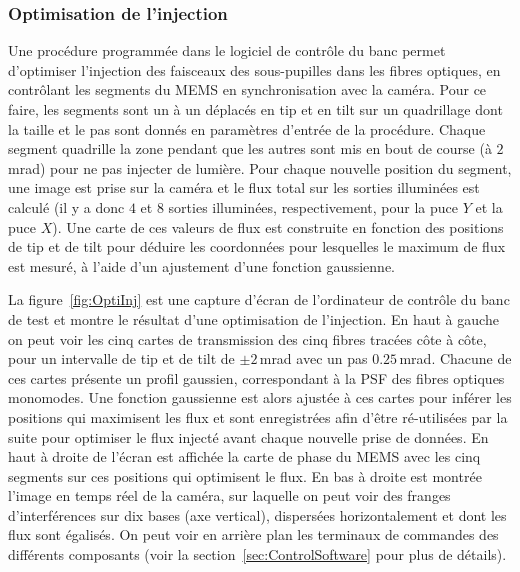 \subsubsection{Optimisation de l'injection}
\label{sec:OptiInj}

Une procédure programmée dans le logiciel de contrôle du banc permet d'optimiser l'injection des faisceaux des sous-pupilles dans les fibres optiques, en contrôlant les segments du \ac{MEMS} en synchronisation avec la caméra. Pour ce faire, les segments sont un à un déplacés en tip et en tilt sur un quadrillage dont la taille et le pas sont donnés en paramètres d'entrée de la procédure. Chaque segment quadrille la zone pendant que les autres sont mis en bout de course (à $2 \,$mrad) pour ne pas injecter de lumière. Pour chaque nouvelle position du segment, une image est prise sur la caméra et le flux total sur les sorties illuminées est calculé (il y a donc $4$ et $8$ sorties illuminées, respectivement, pour la puce $Y$ et la puce $X$). Une carte de ces valeurs de flux est construite en fonction des positions de tip et de tilt pour déduire les coordonnées pour lesquelles le maximum de flux est mesuré, à l'aide d'un ajustement d'une fonction gaussienne. 

La figure~\ref{fig:OptiInj} est une capture d'écran de l'ordinateur de contrôle du banc de test et montre le résultat d'une optimisation de l'injection. En haut à gauche on peut voir les cinq cartes de transmission des cinq fibres tracées côte à côte, pour un intervalle de tip et de tilt de $\pm 2 \,$mrad avec un pas $0.25 \,$mrad. Chacune de ces cartes présente un profil gaussien, correspondant à la \ac{PSF} des fibres optiques monomodes. Une fonction gaussienne est alors ajustée à ces cartes pour inférer les positions qui maximisent les flux et sont enregistrées afin d'être ré-utilisées par la suite pour optimiser le flux injecté avant chaque nouvelle prise de données. En haut à droite de l'écran est affichée la carte de phase du \ac{MEMS} avec les cinq segments sur ces positions qui optimisent le flux. En bas à droite est montrée l'image en temps réel de la caméra, sur laquelle on peut voir des franges d'interférences sur dix bases (axe vertical), dispersées horizontalement et dont les flux sont égalisés. On peut voir en arrière plan les terminaux de commandes des différents composants (voir la section~\ref{sec:ControlSoftware} pour plus de détails).

